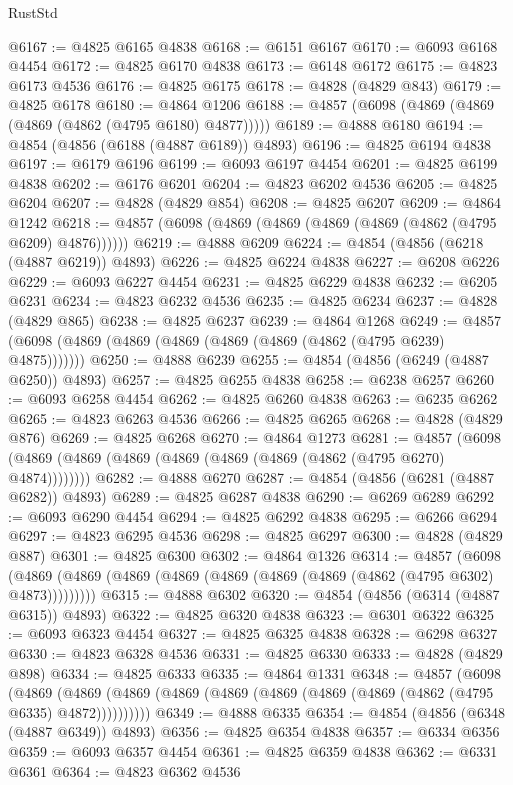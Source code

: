 \begin{lexlean}{RustStd}
\begin{coremodule}
{\begin{coremodule}
{{{{{{{{{{{{{{{{{{{{{{{{{{{{{{{{{{{{{{{{{{{{{{{{{{{{{{{{{{{{{{{{{{{{{{{{{{{{{{{{@6167 := @4825 @6165 @4838
@6168 := @6151 @6167
@6170 := @6093 @6168 @4454
@6172 := @4825 @6170 @4838
@6173 := @6148 @6172
@6175 := @4823 @6173 @4536
@6176 := @4825 @6175
@6178 := @4828 (@4829 @843)
@6179 := @4825 @6178
@6180 := @4864 @1206
@6188 := @4857 (@6098 (@4869 (@4869 (@4869 (@4862 (@4795 @6180) @4877)))))
@6189 := @4888 @6180
@6194 := @4854 (@4856 (@6188 (@4887 @6189)) @4893)
@6196 := @4825 @6194 @4838
@6197 := @6179 @6196
@6199 := @6093 @6197 @4454
@6201 := @4825 @6199 @4838
@6202 := @6176 @6201
@6204 := @4823 @6202 @4536
@6205 := @4825 @6204
@6207 := @4828 (@4829 @854)
@6208 := @4825 @6207
@6209 := @4864 @1242
@6218 := @4857 (@6098 (@4869 (@4869 (@4869 (@4869 (@4862 (@4795 @6209) @4876))))))
@6219 := @4888 @6209
@6224 := @4854 (@4856 (@6218 (@4887 @6219)) @4893)
@6226 := @4825 @6224 @4838
@6227 := @6208 @6226
@6229 := @6093 @6227 @4454
@6231 := @4825 @6229 @4838
@6232 := @6205 @6231
@6234 := @4823 @6232 @4536
@6235 := @4825 @6234
@6237 := @4828 (@4829 @865)
@6238 := @4825 @6237
@6239 := @4864 @1268
@6249 := @4857 (@6098 (@4869 (@4869 (@4869 (@4869 (@4869 (@4862 (@4795 @6239) @4875)))))))
@6250 := @4888 @6239
@6255 := @4854 (@4856 (@6249 (@4887 @6250)) @4893)
@6257 := @4825 @6255 @4838
@6258 := @6238 @6257
@6260 := @6093 @6258 @4454
@6262 := @4825 @6260 @4838
@6263 := @6235 @6262
@6265 := @4823 @6263 @4536
@6266 := @4825 @6265
@6268 := @4828 (@4829 @876)
@6269 := @4825 @6268
@6270 := @4864 @1273
@6281 := @4857 (@6098 (@4869 (@4869 (@4869 (@4869 (@4869 (@4869 (@4862 (@4795 @6270) @4874))))))))
@6282 := @4888 @6270
@6287 := @4854 (@4856 (@6281 (@4887 @6282)) @4893)
@6289 := @4825 @6287 @4838
@6290 := @6269 @6289
@6292 := @6093 @6290 @4454
@6294 := @4825 @6292 @4838
@6295 := @6266 @6294
@6297 := @4823 @6295 @4536
@6298 := @4825 @6297
@6300 := @4828 (@4829 @887)
@6301 := @4825 @6300
@6302 := @4864 @1326
@6314 := @4857
    (@6098 (@4869 (@4869 (@4869 (@4869 (@4869 (@4869 (@4869 (@4862 (@4795 @6302) @4873)))))))))
@6315 := @4888 @6302
@6320 := @4854 (@4856 (@6314 (@4887 @6315)) @4893)
@6322 := @4825 @6320 @4838
@6323 := @6301 @6322
@6325 := @6093 @6323 @4454
@6327 := @4825 @6325 @4838
@6328 := @6298 @6327
@6330 := @4823 @6328 @4536
@6331 := @4825 @6330
@6333 := @4828 (@4829 @898)
@6334 := @4825 @6333
@6335 := @4864 @1331
@6348 := @4857
    (@6098
      (@4869 (@4869 (@4869 (@4869 (@4869 (@4869 (@4869 (@4869 (@4862 (@4795 @6335) @4872))))))))))
@6349 := @4888 @6335
@6354 := @4854 (@4856 (@6348 (@4887 @6349)) @4893)
@6356 := @4825 @6354 @4838
@6357 := @6334 @6356
@6359 := @6093 @6357 @4454
@6361 := @4825 @6359 @4838
@6362 := @6331 @6361
@6364 := @4823 @6362 @4536
}}}}}}}}}}}}}}}}}}}}}}}}}}}}}}}}}}}}}}}}}}}}}}}}}}}}}}}}}}}}}}}}}}}}}}}}}}}}}}}}
\end{coremodule}}
\end{coremodule}
\end{lexlean}
